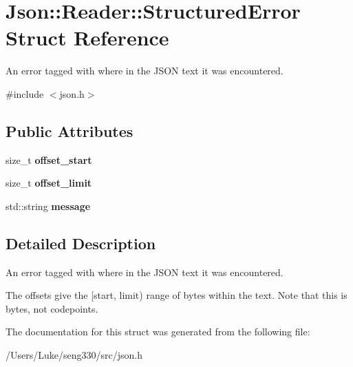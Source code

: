 \hypertarget{struct_json_1_1_reader_1_1_structured_error}{}\section{Json\+:\+:Reader\+:\+:Structured\+Error Struct Reference}
\label{struct_json_1_1_reader_1_1_structured_error}


An error tagged with where in the J\+S\+O\+N text it was encountered.  




{\ttfamily \#include $<$json.\+h$>$}

\subsection*{Public Attributes}
\begin{DoxyCompactItemize}
\item 
\hypertarget{struct_json_1_1_reader_1_1_structured_error_a160dae4eb3464a2209b743c755baf65f}{}size\+\_\+t {\bfseries offset\+\_\+start}\label{struct_json_1_1_reader_1_1_structured_error_a160dae4eb3464a2209b743c755baf65f}

\item 
\hypertarget{struct_json_1_1_reader_1_1_structured_error_a80747dae744bcc80a9bc81c94fd42e13}{}size\+\_\+t {\bfseries offset\+\_\+limit}\label{struct_json_1_1_reader_1_1_structured_error_a80747dae744bcc80a9bc81c94fd42e13}

\item 
\hypertarget{struct_json_1_1_reader_1_1_structured_error_ab8755e5201b78c6ae077338f8819e6e6}{}std\+::string {\bfseries message}\label{struct_json_1_1_reader_1_1_structured_error_ab8755e5201b78c6ae077338f8819e6e6}

\end{DoxyCompactItemize}


\subsection{Detailed Description}
An error tagged with where in the J\+S\+O\+N text it was encountered. 

The offsets give the \mbox{[}start, limit) range of bytes within the text. Note that this is bytes, not codepoints. 

The documentation for this struct was generated from the following file\+:\begin{DoxyCompactItemize}
\item 
/\+Users/\+Luke/seng330/src/json.\+h\end{DoxyCompactItemize}
